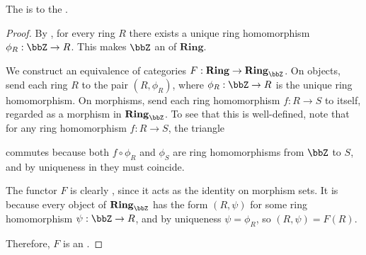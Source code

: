 \begin{lemma}  \label{lemma:category_of_rings_is_category_of_Z_rings}
    The  is  to the .
\end{lemma}

\begin{proof}
    By , for every ring $R$ there exists a unique ring homomorphism $\phi_R: \bbZ \to R$. This makes $\bbZ$ an  of $\mathbf{Ring}$.

    We construct an equivalence of categories $F: \mathbf{Ring} \to \mathbf{Ring}_\bbZ$. On objects, send each ring $R$ to the pair $(R, \phi_R)$, where $\phi_R: \bbZ \to R$ is the unique ring homomorphism. On morphisms, send each ring homomorphism $f: R \to S$ to itself, regarded as a morphism in $\mathbf{Ring}_\bbZ$. To see that this is well-defined, note that for any ring homomorphism $f: R \to S$, the triangle
    \begin{center}
    \end{center}
    commutes because both $f \circ \phi_R$ and $\phi_S$ are ring homomorphisms from $\bbZ$ to $S$, and by uniqueness in  they must coincide.

    The functor $F$ is clearly , since it acts as the identity on morphism sets. It is  because every object of $\mathbf{Ring}_\bbZ$ has the form $(R, \psi)$ for some ring homomorphism $\psi: \bbZ \to R$, and by uniqueness $\psi = \phi_R$, so $(R, \psi) = F(R)$.

    Therefore, $F$ is an .
\end{proof}
